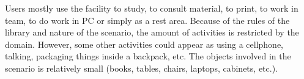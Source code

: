 Users mostly use the facility to study, to consult material, to print, to work in team, to do work in PC or simply as a rest area.
Because of the rules of the library and nature of the scenario, the amount of activities is restricted by the domain.
However, some other activities could appear as using a cellphone, talking, packaging things inside a backpack, etc.
The objects involved in the scenario is relatively small (books, tables, chairs, laptops, cabinets, etc.).





